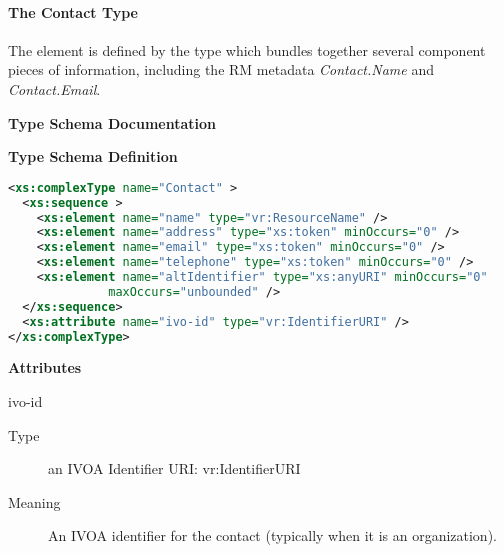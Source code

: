 \documentclass[11pt,a4paper]{ivoa}
\begin{document}

\paragraph{The Contact Type}

The  element is defined by the
 type which bundles together several component
pieces of information, including the RM metadata \emph{Contact.Name}
and \emph{Contact.Email}.



\begin{generated}
\begingroup
        \renewcommand*\descriptionlabel[1]{%
        \hbox to 5.5em{\emph{#1}\hfil}}\vspace{2ex}\noindent\textbf{ Type Schema Documentation}


\vspace{1ex}\noindent\textbf{ Type Schema Definition}

\begin{lstlisting}[language=XML,basicstyle=\footnotesize]
<xs:complexType name="Contact" >
  <xs:sequence >
    <xs:element name="name" type="vr:ResourceName" />
    <xs:element name="address" type="xs:token" minOccurs="0" />
    <xs:element name="email" type="xs:token" minOccurs="0" />
    <xs:element name="telephone" type="xs:token" minOccurs="0" />
    <xs:element name="altIdentifier" type="xs:anyURI" minOccurs="0"
              maxOccurs="unbounded" />
  </xs:sequence>
  <xs:attribute name="ivo-id" type="vr:IdentifierURI" />
</xs:complexType>
\end{lstlisting}

\vspace{0.5ex}\noindent\textbf{ Attributes}

\begingroup\small\begin{bigdescription}
\item[ivo-id]
\begin{description}
\item[Type] an IVOA Identifier URI: vr:IdentifierURI
\item[Meaning]
             An IVOA identifier for the contact (typically when it is
             an organization).


\end{description}
\end{bigdescription}
\end{generated}
\end{document}
